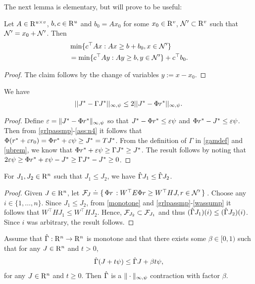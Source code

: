 The next lemma is elementary, but will prove to be useful:
\begin{lemma}\label{lpsol}
Let $A\in \mathrm{R}^{u\times v}$, $b,c\in \mathrm{R}^u$ and $b_0=Ax_0$ for 
some $x_0 \in \mathrm{R}^v$, $\mathcal{N}' \subset \mathrm{R}^v$ such that $\mathcal{N}' =x_0+ \mathcal{N}'$. Then
\begin{align}
&\min\{c^\top Ax:Ax\geq b+b_0, x\in \mathcal{N}'\} \nonumber\\
&=\min\{c^\top A y:Ay \geq b, y \in \mathcal{N}' \}+c^\top b_0.
\end{align}
\end{lemma}
\begin{proof}
The claim follows by the change of variables $y := x-x_0$.
\end{proof}
\noindent 
\begin{lemma}\label{bestbndmn}
We have
\begin{align}
||J^*-\Gamma J^*||_{\infty,\psi}\leq 2||J^*-\Phi r^*||_{\infty,\psi}.
\end{align}
\end{lemma}
\begin{proof}
Define $\varepsilon = \|J^* - \Phi r^*\|_{\infty,\psi}$ so that
$ J^*-\Phi r^* \le \varepsilon \psi$ and $\Phi r^* - J^*\le \varepsilon \psi$. Then from \cref{grlpassmp}-\eqref{ass:n4} it follows that $\Phi( r^* + \varepsilon r_0 ) = \Phi r^* + \varepsilon \psi \ge J^* = T J^*$. From the definition of $\Gamma$ in \eqref{gamdef} and \cref{ubrem}, we know that $\Phi r^*+\varepsilon \psi \geq \Gamma J^*\geq J^*$. The result follows by noting that $2\varepsilon\psi\geq \Phi r^*+\varepsilon\psi -J^*\geq \Gamma J^*-J^*\geq 0$.
\end{proof}
\begin{lemma}\label{tgmonotone}
For $J_1, J_2\in \mathrm{R}^n$ such that $J_1\leq J_2$, we have $\hat{\Gamma} J_1\leq \hat{\Gamma} J_2$.
\end{lemma}
\begin{proof}
Given $J\in \mathrm{R}^n$, let $\mathcal{F}_J\doteq\{\,\Phi r\,: W^\top E \Phi r\geq W^\top HJ, r\in \mathcal{N}'\,\}\,$. Choose any $i\in \{1, \ldots, n\}$. Since $J_1\leq J_2$, from \cref{monotone} and \cref{grlpassmp}-\eqref{wassump} it follows that $W^\top H J_1\leq W^\top H J_2$. Hence, $\mathcal{F}_{J_2} \subset \mathcal{F}_{J_1}$ and thus $(\hat{\Gamma} J_1)(i) \le (\hat{\Gamma} J_2)(i)$.  Since $i$ was arbitrary, the result follows. 
\end{proof}
\begin{lemma}\label{maxnormmn}
Assume that $\hat{\Gamma}: \mathrm{R}^n \to \mathrm{R}^n$ is monotone and 
that there exists some $\beta\in [0,1)$ such that for any $J\in \mathrm{R}^n$ and $t>0$,
\begin{align}
\label{eq:shiftmn}
\hg( J + t \psi) \le \hg J + \beta t \psi,
\end{align} 
for any $J\in \mathrm{R}^n$ and $t\ge 0$.
Then $\hat{\Gamma}$ is a $\|\cdot\|_{\infty,\psi}$ contraction with factor $\beta$.
\end{lemma}
